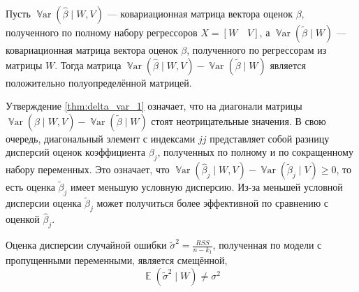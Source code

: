 \documentclass[12pt]{article}
\DeclareMathOperator{\Var}{\mathbb{V}ar}
\DeclareMathOperator{\E}{\mathbb{E}}
\renewcommand{\b}{\beta}
\newcommand{\hb}{\hat{\beta}}
\newcommand{\tb}{\tilde{\beta}}
\newcommand{\RSS}{RSS}
\begin{document}
\begin{lemma}
\label{thm:delta_var_1}
Пусть $\Var(\hb \mid W, V)$ — ковариационная матрица вектора оценок $\beta$, полученного по полному набору регрессоров $X = [W \quad V]$, а $\Var(\tb \mid W)$ — ковариационная матрица вектора оценок $\beta$, полученного по регрессорам  из матрицы $W$. Тогда матрица $\Var(\hb \mid W, V) - \Var(\tb \mid W)$ является положительно полуопределённой матрицей.
\end{lemma}

Утверждение \ref{thm:delta_var_1} означает, что на диагонали матрицы $\Var(\hb \mid W, V) - \Var(\tb \mid W)$ стоят неотрицательные значения. 
В свою очередь, диагональный элемент с индексами ${jj}$ представляет собой разницу дисперсий оценок коэффициента $\b_j$, полученных по полному и по сокращенному набору переменных. 
Это означает, что $\Var(\hb_j \mid W, V) - \Var(\tb_j \mid V) \geq 0$, то есть оценка $\tb_j$ имеет меньшую условную дисперсию. 
Из-за меньшей условной дисперсии оценка $\tb_j$ может получиться более эффективной по сравнению с оценкой $\hb_j$.

\begin{lemma}
    Оценка дисперсии случайной ошибки $\tilde\sigma^2 = \frac{\RSS}{n-k_1}$, полученная по модели с пропущенными переменными, является смещённой,
    \[
    \E(\tilde\sigma^2 \mid W)  \neq \sigma^2
    \]
\end{lemma}
\end{document}
